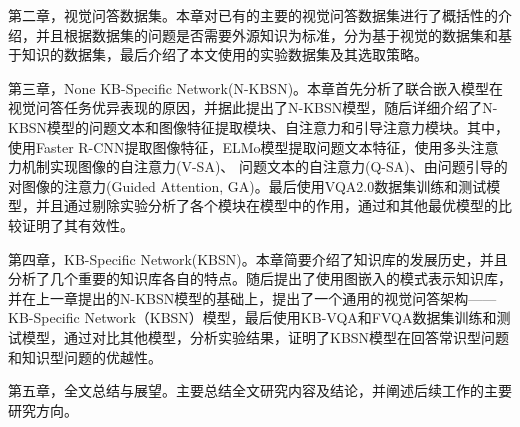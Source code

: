 第二章，视觉问答数据集。本章对已有的主要的视觉问答数据集进行了概括性的介绍，并且根据数据集的问题是否需要外源知识为标准，分为基于视觉的数据集和基于知识的数据集，最后介绍了本文使用的实验数据集及其选取策略。

第三章，None KB-Specific Network(N-KBSN)。本章首先分析了联合嵌入模型在视觉问答任务优异表现的原因，并据此提出了N-KBSN模型，随后详细介绍了N-KBSN模型的问题文本和图像特征提取模块、自注意力和引导注意力模块。其中，使用Faster R-CNN提取图像特征，ELMo模型提取问题文本特征，使用多头注意力机制实现图像的自注意力(V-SA)、 问题文本的自注意力(Q-SA)、由问题引导的对图像的注意力(Guided Attention, GA)。最后使用VQA2.0数据集训练和测试模型，并且通过剔除实验分析了各个模块在模型中的作用，通过和其他最优模型的比较证明了其有效性。

第四章，KB-Specific Network(KBSN)。本章简要介绍了知识库的发展历史，并且分析了几个重要的知识库各自的特点。随后提出了使用图嵌入的模式表示知识库，并在上一章提出的N-KBSN模型的基础上，提出了一个通用的视觉问答架构——KB-Specific Network（KBSN）模型，最后使用KB-VQA和FVQA数据集训练和测试模型，通过对比其他模型，分析实验结果，证明了KBSN模型在回答常识型问题和知识型问题的优越性。

第五章，全文总结与展望。主要总结全文研究内容及结论，并阐述后续工作的主要研究方向。

